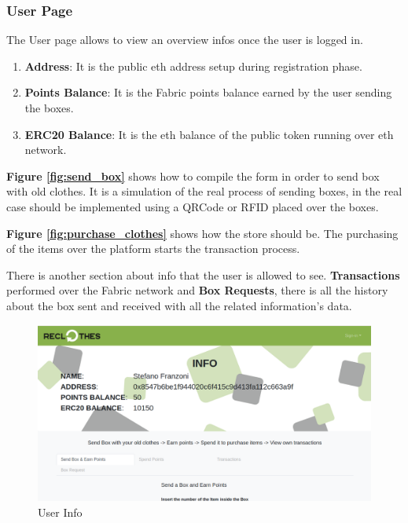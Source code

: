 \newpage
\subsubsection{User Page}

The User page allows to view an overview infos once the user is logged in. 

\begin{enumerate}[-]
    \item \textbf{Address}: It is the public eth address setup during registration phase. 
    \item \textbf{Points Balance}: It is the Fabric points balance earned by the user sending the boxes.
    \item \textbf{ERC20 Balance}: It is the eth balance of the public token running over eth network.
\end{enumerate}

\textbf{Figure \ref{fig:send_box}} shows how to compile the form in order to send box with old clothes. 
It is a simulation of the real process of sending boxes, in the real case should be implemented using a QRCode 
or RFID placed over the boxes.

\textbf{Figure \ref{fig:purchase_clothes}} shows how the store should be. The purchasing of the items over 
the platform starts the transaction process. 

There is another section about info that the user is allowed to see. \textbf{Transactions} performed over the 
Fabric network and \textbf{Box Requests}, there is all the history about the box sent and received with all 
the related information's data.  
\clearpage

\begin{figure}[h!]
    \centering
    \includegraphics[totalheight=7.5cm]{img/dapp/user-info.png}
    \caption{User Info}
    \label{fig:user_info}
\end{figure}

